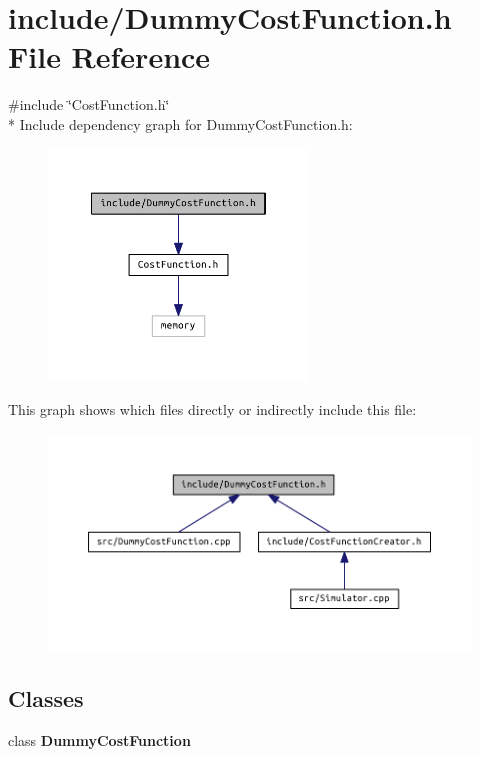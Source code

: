 \section{include/\+Dummy\+Cost\+Function.h File Reference}
\label{_dummy_cost_function_8h}
{\ttfamily \#include \char`\"{}Cost\+Function.\+h\char`\"{}}\\*
Include dependency graph for Dummy\+Cost\+Function.\+h\+:\nopagebreak
\begin{figure}[H]
\begin{center}
\leavevmode
\includegraphics[width=196pt]{_dummy_cost_function_8h__incl}
\end{center}
\end{figure}
This graph shows which files directly or indirectly include this file\+:\nopagebreak
\begin{figure}[H]
\begin{center}
\leavevmode
\includegraphics[width=350pt]{_dummy_cost_function_8h__dep__incl}
\end{center}
\end{figure}
\subsection*{Classes}
\begin{DoxyCompactItemize}
\item 
class {\bf Dummy\+Cost\+Function}
\end{DoxyCompactItemize}
